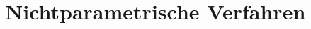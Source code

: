 \documentclass[handout,aspectratio=1610,dvipsnames]{beamer}
\begin{document}
  \section{Nichtparametrische Verfahren}
  \let\woopsi\section\let\section\subsection\let\subsection\subsubsection
  
  \let\subsection\section\let\section\woopsi
\end{document}
